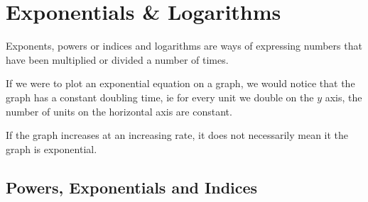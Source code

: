 \chapter{Exponentials \& Logarithms}
\label{sec:ExponentialsAndLogarithms}
Exponents, powers or indices and logarithms are ways of expressing numbers that
have been multiplied or divided a number of times.

If we were to plot an exponential equation on a graph, we would notice that
the graph has a constant doubling time, ie for every unit we double on the
$y$ axis, the number of units on the horizontal axis are constant.

If the graph increases at an increasing rate, it does not necessarily mean it
the graph is exponential.

\section{Powers, Exponentials and Indices}
\label{sec:PowersExponentialsAndIndices}

